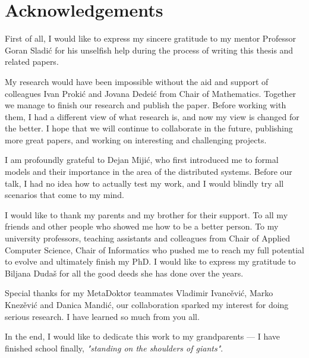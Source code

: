 \chapter*{Acknowledgements}
First of all, I would like to express my sincere gratitude to my mentor Professor Goran Sladi\'c for his unselfish help during the process of writing this thesis and related papers.

My research would have been impossible without the aid and support of colleagues Ivan Proki\'c and Jovana Dedei\'c from Chair of Mathematics. Together we manage to finish our research and publish the paper. Before working with them, I had a different view of what research is, and now my view is changed for the better. I hope that we will continue to collaborate in the future, publishing more great papers, and working on interesting and challenging projects.

I am profoundly grateful to Dejan Miji\'c, who first introduced me to formal models and their importance in the area of the distributed systems. Before our talk, I had no idea how to actually test my work, and I would blindly try all scenarios that come to my mind.

I would like to thank my parents and my brother for their support. To all my friends and other people who showed me how to be a better person. To my university professors, teaching assistants and colleagues from Chair of Applied Computer Science, Chair of Informatics who pushed me to reach my full potential to evolve and ultimately finish my PhD. I would like to express my gratitude to Biljana Duda\v s for all the good deeds she has done over the years.

Special thanks for my MetaDoktor teammates Vladimir Ivanc\v evi\'c, Marko Knez\v evi\'c and Danica Mandi\'c, our collaboration sparked my interest for doing serious research. I have learned so much from you all.

In the end, I would like to dedicate this work to my grandparents --- I have finished school finally, \emph{"standing on the shoulders of giants"}.